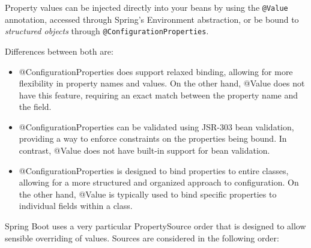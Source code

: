 \documentclass{scrartcl}
\begin{document}
Property values can be injected directly into your beans by using the \lstinline |@Value| annotation, accessed through Spring’s Environment abstraction, or be bound to \textit{structured objects} through \lstinline[]|@ConfigurationProperties|.

Differences between both are:

\begin{itemize}
    \item @ConfigurationProperties does support relaxed binding, allowing for more flexibility in property names and values. On the other hand, @Value does not have this feature, requiring an exact match between the property name and the field.
    \item @ConfigurationProperties can be validated using JSR-303 bean validation, providing a way to enforce constraints on the properties being bound. In contrast, @Value does not have built-in support for bean validation.
    \item @ConfigurationProperties is designed to bind properties to entire classes, allowing for a more structured and organized approach to configuration. On the other hand, @Value is typically used to bind specific properties to individual fields within a class.
\end{itemize}

Spring Boot uses a very particular PropertySource order that is designed to allow sensible overriding of values. Sources are considered in the following order:
\end{document}
